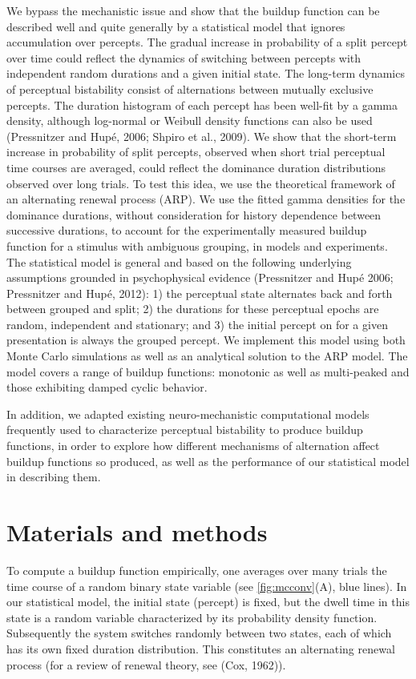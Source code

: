We bypass the mechanistic issue and show that the buildup function can be described well and quite generally by a statistical model that ignores accumulation over percepts. The gradual increase in probability of a split percept over time could reflect the dynamics of switching between percepts with independent random durations and a given initial state. The long-term dynamics of perceptual bistability consist of alternations between mutually exclusive percepts. The duration histogram of each percept has been well-fit by a gamma density, although log-normal or Weibull density functions can also be used (Pressnitzer and Hupé, 2006; Shpiro et al., 2009). We show that the short-term increase in probability of split percepts, observed when short trial perceptual time courses are averaged, could reflect the dominance duration distributions observed over long trials. To test this idea, we use the theoretical framework of an alternating renewal process (ARP). We use the fitted gamma densities for the dominance durations, without consideration for history dependence between successive durations, to account for the experimentally measured buildup function for a stimulus with ambiguous grouping, in models and experiments. The statistical model is general and based on the following underlying assumptions grounded in psychophysical evidence (Pressnitzer and Hupé 2006; Pressnitzer and Hupé, 2012): 1) the perceptual state alternates back and forth between grouped and split; 2) the durations for these perceptual epochs are random, independent and stationary; and 3) the initial percept on for a given presentation is always the grouped percept. We implement this model using both Monte Carlo simulations as well as an analytical solution to the ARP model. The model covers a range of buildup functions: monotonic as well as multi-peaked and those exhibiting damped cyclic behavior.

In addition, we adapted existing neuro-mechanistic computational models frequently used to characterize perceptual bistability to produce buildup functions, in order to explore how different mechanisms of alternation affect buildup functions so produced, as well as the performance of our statistical model in describing them.

\section{Materials and methods}


To compute a buildup function empirically, one averages over many trials the time course of a random binary state variable (see \ref{fig:mcconv}(A), blue lines). In our statistical model, the initial state (percept) is fixed, but the dwell time in this state is a random variable characterized by its probability density function. Subsequently the system switches randomly between two states, each of which has its own fixed duration distribution. This constitutes an alternating renewal process (for a review of renewal theory, see (Cox, 1962)). 

